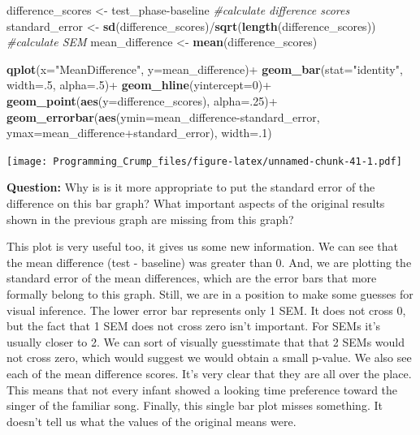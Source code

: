 \documentclass[]{book}
\newenvironment{Shaded}{\begin{snugshade}}{\end{snugshade}}
\newcommand{\KeywordTok}[1]{\textcolor[rgb]{0.13,0.29,0.53}{\textbf{{#1}}}}
\newcommand{\DataTypeTok}[1]{\textcolor[rgb]{0.13,0.29,0.53}{{#1}}}
\newcommand{\DecValTok}[1]{\textcolor[rgb]{0.00,0.00,0.81}{{#1}}}
\newcommand{\StringTok}[1]{\textcolor[rgb]{0.31,0.60,0.02}{{#1}}}
\newcommand{\CommentTok}[1]{\textcolor[rgb]{0.56,0.35,0.01}{\textit{{#1}}}}
\newcommand{\NormalTok}[1]{{#1}}
\theoremstyle{definition}
\theoremstyle{definition}
\theoremstyle{definition}
\theoremstyle{remark}
\begin{document}
\begin{Shaded}
\begin{Highlighting}[]
\NormalTok{difference_scores <-}\StringTok{ }\NormalTok{test_phase-baseline }\CommentTok{#calculate difference scores}
\NormalTok{standard_error <-}\StringTok{ }\KeywordTok{sd}\NormalTok{(difference_scores)/}\KeywordTok{sqrt}\NormalTok{(}\KeywordTok{length}\NormalTok{(difference_scores)) }\CommentTok{#calculate SEM}
\NormalTok{mean_difference <-}\StringTok{ }\KeywordTok{mean}\NormalTok{(difference_scores)}

\KeywordTok{qplot}\NormalTok{(}\DataTypeTok{x=}\StringTok{"MeanDifference"}\NormalTok{, }\DataTypeTok{y=}\NormalTok{mean_difference)+}
\StringTok{  }\KeywordTok{geom_bar}\NormalTok{(}\DataTypeTok{stat=}\StringTok{"identity"}\NormalTok{, }\DataTypeTok{width=}\NormalTok{.}\DecValTok{5}\NormalTok{, }\DataTypeTok{alpha=}\NormalTok{.}\DecValTok{5}\NormalTok{)+}
\StringTok{  }\KeywordTok{geom_hline}\NormalTok{(}\DataTypeTok{yintercept=}\DecValTok{0}\NormalTok{)+}
\StringTok{  }\KeywordTok{geom_point}\NormalTok{(}\KeywordTok{aes}\NormalTok{(}\DataTypeTok{y=}\NormalTok{difference_scores), }\DataTypeTok{alpha=}\NormalTok{.}\DecValTok{25}\NormalTok{)+}
\StringTok{  }\KeywordTok{geom_errorbar}\NormalTok{(}\KeywordTok{aes}\NormalTok{(}\DataTypeTok{ymin=}\NormalTok{mean_difference-standard_error, }
                                  \DataTypeTok{ymax=}\NormalTok{mean_difference+standard_error), }\DataTypeTok{width=}\NormalTok{.}\DecValTok{1}\NormalTok{)}
\end{Highlighting}
\end{Shaded}

\texttt{[image: Programming\_Crump\_files/figure-latex/unnamed-chunk-41-1.pdf]}

\textbf{Question:} Why is is it more appropriate to put the standard
error of the difference on this bar graph? What important aspects of the
original results shown in the previous graph are missing from this
graph?

This plot is very useful too, it gives us some new information. We can
see that the mean difference (test - baseline) was greater than 0. And,
we are plotting the standard error of the mean differences, which are
the error bars that more formally belong to this graph. Still, we are in
a position to make some guesses for visual inference. The lower error
bar represents only 1 SEM. It does not cross 0, but the fact that 1 SEM
does not cross zero isn't important. For SEMs it's usually closer to 2.
We can sort of visually guesstimate that that 2 SEMs would not cross
zero, which would suggest we would obtain a small p-value. We also see
each of the mean difference scores. It's very clear that they are all
over the place. This means that not every infant showed a looking time
preference toward the singer of the familiar song. Finally, this single
bar plot misses something. It doesn't tell us what the values of the
original means were.
\end{document}
